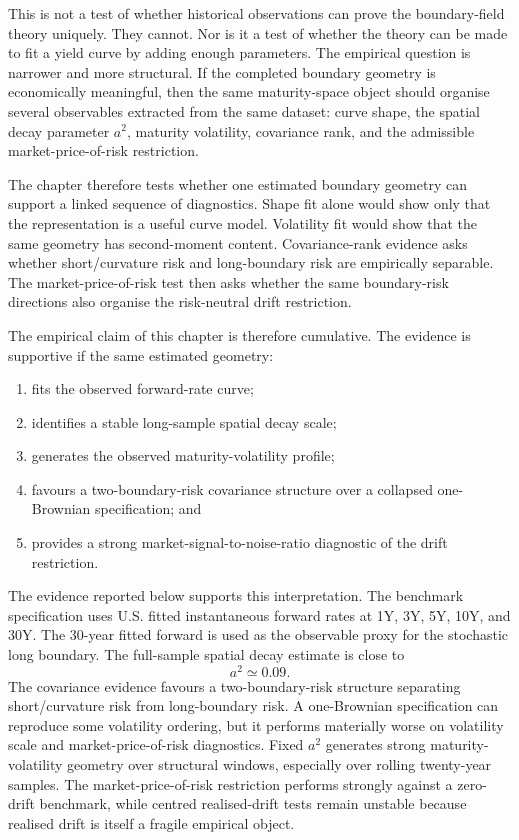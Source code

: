 \documentclass[11pt,oneside]{book}
\begin{document}
This is not a test of whether historical observations can prove the boundary-field theory uniquely. They cannot. Nor is it a test of whether the theory can be made to fit a yield curve by adding enough parameters. The empirical question is narrower and more structural. If the completed boundary geometry is economically meaningful, then the same maturity-space object should organise several observables extracted from the same dataset: curve shape, the spatial decay parameter \(a^2\), maturity volatility, covariance rank, and the admissible market-price-of-risk restriction.

The chapter therefore tests whether one estimated boundary geometry can support a linked sequence of diagnostics. Shape fit alone would show only that the representation is a useful curve model. Volatility fit would show that the same geometry has second-moment content. Covariance-rank evidence asks whether short/curvature risk and long-boundary risk are empirically separable. The market-price-of-risk test then asks whether the same boundary-risk directions also organise the risk-neutral drift restriction.

The empirical claim of this chapter is therefore cumulative. The evidence is supportive if the same estimated geometry:
\begin{enumerate}
    \item fits the observed forward-rate curve;
    \item identifies a stable long-sample spatial decay scale;
    \item generates the observed maturity-volatility profile;
    \item favours a two-boundary-risk covariance structure over a collapsed one-Brownian specification; and
    \item provides a strong market-signal-to-noise-ratio diagnostic of the drift restriction.
\end{enumerate}

The evidence reported below supports this interpretation. The benchmark specification uses U.S. fitted instantaneous forward rates at 1Y, 3Y, 5Y, 10Y, and 30Y. The 30-year fitted forward is used as the observable proxy for the stochastic long boundary. The full-sample spatial decay estimate is close to
\[
a^2 \simeq 0.09.
\]
The covariance evidence favours a two-boundary-risk structure separating short/curvature risk from long-boundary risk. A one-Brownian specification can reproduce some volatility ordering, but it performs materially worse on volatility scale and market-price-of-risk diagnostics. Fixed \(a^2\) generates strong maturity-volatility geometry over structural windows, especially over rolling twenty-year samples. The market-price-of-risk restriction performs strongly against a zero-drift benchmark, while centred realised-drift tests remain unstable because realised drift is itself a fragile empirical object.
\end{document}
